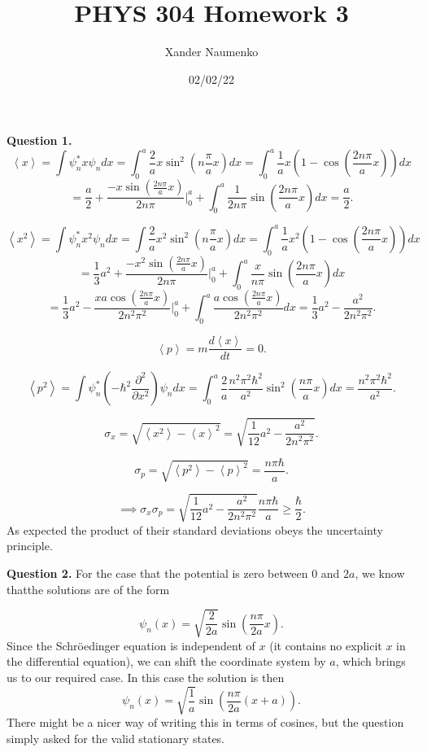 \documentclass[letterpaper, reqno,11pt]{article}
\begin{document}
\title{PHYS 304 Homework 3}
\date{02/02/22}
\author{Xander Naumenko}
\maketitle

{\noindent\bf Question 1.} 
\[
\left<x \right>=\int \psi_n^* x\psi_n dx=\int_0^a \frac{2}{a}x\sin^2\left( n\frac{\pi}{a}x \right)dx=\int_0^a \frac{1}{a}x\left(1-\cos\left( \frac{2n\pi}{a}x \right)\right)dx
\]
\[
=\frac{a}{2}+\frac{-x\sin\left( \frac{2n\pi}{a}x \right) }{2n\pi}\bigg|_0^a+\int_0^a \frac{1}{2n\pi}\sin\left( \frac{2n\pi}{a}x \right) dx=\frac{a}{2}
.\]

\[
\left<x^2 \right>=\int \psi_n^* x^2\psi_n dx=\int \frac{2}{a}x^2\sin^2\left( n\frac{\pi}{a}x \right)dx=\int_0^a \frac{1}{a}x^2\left(1-\cos\left( \frac{2n\pi}{a}x \right)\right)dx
\]
\[
=\frac{1}{3}a^2+\frac{-x^2\sin\left( \frac{2n\pi}{a}x \right) }{2n\pi}\bigg|_0^{a}+\int_0^a \frac{x}{n\pi}\sin\left( \frac{2n\pi}{a}x \right) dx
\]
\[
=\frac{1}{3}a^2-\frac{xa\cos\left( \frac{2n\pi}{a}x \right) }{2n^2\pi^2}\bigg|_0^a+\int_0^{a}\frac{a\cos\left( \frac{2n\pi}{a}x \right) }{2n^2\pi^2}dx=\frac{1}{3}a^2-\frac{a^2}{2n^2\pi^2}
.\]

\[
\left<p \right>=m \frac{d\left<x \right>}{dt}=0
.\]

\[
\left<p^2 \right>=\int \psi_n^* \left(-\hbar^2 \frac{\partial^2}{\partial x^2}\right)\psi_n dx=\int_0^a \frac{2}{a}\frac{n^2\pi^2 \hbar^2}{a^2}\sin^2\left( \frac{n\pi}{a}x \right) dx=\frac{n^2\pi^2\hbar^2}{a^2}
.\]

\[
\sigma_x=\sqrt{\left<x^2 \right>-\left<x \right>^2}=\sqrt{\frac{1}{12}a^2-\frac{a^2}{2n^2\pi^2}}  
.\]

\[
\sigma_p=\sqrt{\left<p^2 \right>-\left<p \right>^2} =\frac{n\pi\hbar}{a}
.\]

\[
\implies\sigma_x\sigma_p=\sqrt{\frac{1}{12}a^2-\frac{a^2}{2n^2\pi^2}}  \frac{n\pi\hbar}{a}\geq \frac{\hbar}{2}
.\]
As expected the product of their standard deviations obeys the uncertainty principle. 

{\noindent\bf Question 2.} For the case that the potential is zero between $0$ and $2a$, we know thatthe solutions are of the form

\[
\psi_n(x)=\sqrt{\frac{2}{2a}} \sin\left( \frac{n\pi}{2a}x \right) 
.\]
Since the Schr\"oedinger equation is independent of $x$ (it contains no explicit $x$ in the differential equation), we can shift the coordinate system by $a$, which brings us to our required case. In this case the solution is then 
\[
\psi_n(x)=\sqrt{\frac{1}{a}} \sin\left( \frac{n\pi}{2a}(x+a) \right) 
.\]
There might be a nicer way of writing this in terms of cosines, but the question simply asked for the valid stationary states. 
\end{document}
